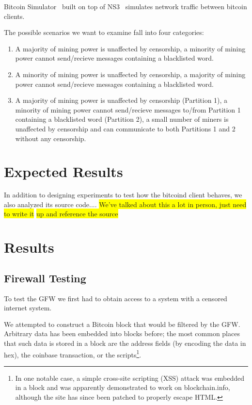Bitcoin Simulator~\cite{bitcoin-simulator} built on top of NS3~\cite{NS3} simulates network traffic between bitcoin clients. %

The possible scenarios we want to examine fall into four categories:
\begin{enumerate}
\item A majority of mining power is unaffected by censorship, a minority of mining power cannot send/recieve messages containing a blacklisted word.
\item A minority of mining power is unaffected by censorship, a majority of mining power cannot send/recieve messages containing a blacklisted word.
\item A majority of mining power is unaffected by censorship (Partition 1), a minority of mining power cannot send/recieve messages to/from Partition 1 containing a blacklisted word (Partition 2), a small number of miners is unaffected by censorship and can communicate to both Partitions 1 and 2 without any censorship.
\end{enumerate}

\section{Expected Results}
In addition to designing experiments to test how the bitcoind client behaves, we also analyzed its source code....
\colorbox{yellow}{We've talked about this a lot in person, just need to write it} \colorbox{yellow}{up and reference the source}

\section{Results}

\subsection{Firewall Testing}
To test the GFW we first had to obtain access to a system with a censored internet system. 

We attempted to construct a Bitcoin block that would be filtered by the GFW. Arbitrary data has been embedded into blocks before; the most common places that such data is stored in a block are the address fields (by encoding the data in hex), the coinbase transaction, or the scripts\footnote{In one notable case, a simple cross-site scripting (XSS) attack was embedded in a block and was apparently demonstrated to work on blockchain.info\cite{reddit}, although the site has since been patched to properly escape HTML.}. 

